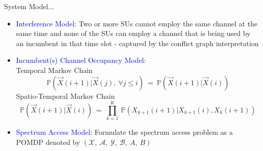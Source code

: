 \documentclass{beamer}
\begin{document}
\begin{frame}{System Model...}
\begin{itemize}
    \item \textcolor{blue}{Interference Model}: Two or more SUs cannot employ the same channel at the same time and none of the SUs can employ a channel that is being used by an incumbent in that time slot - captured by the conflict graph interpretation
    \item \textcolor{blue}{Incumbent(s) Channel Occupancy Model}:
    \\Temporal Markov Chain
    \begin{equation*}
        \mathbb{P}(\vec{X}(i+1)|\vec{X}(j),\ \forall j \leq i)\ =\ \mathbb{P}(\vec{X}(i+1)|\vec{X}(i))
    \end{equation*}
    Spatio-Temporal Markov Chain
    \begin{equation*}
        \mathbb{P}(\vec{X}(i+1)|\vec{X}(i))\ =\ 
             \prod_{k=1}^K\ \mathbb{P}(X_{k+1}(i+1)|X_{k+1}(i),X_{k}(i+1))
    \end{equation*}
    \item \textcolor{blue}{Spectrum Access Model}: Formulate the spectrum access problem as a POMDP denoted by $(\mathcal{X},\ \mathcal{A},\ \mathcal{Y},\ \mathcal{B},\ A,\ B)$
\end{itemize}
\vskip 1cm
\end{frame}
\end{document}
